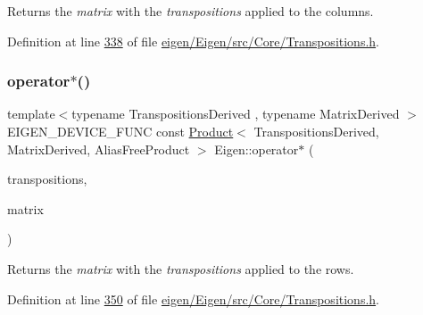 \begin{DoxyReturn}{Returns}
the {\itshape matrix} with the {\itshape transpositions} applied to the columns. 
\end{DoxyReturn}


Definition at line \hyperlink{eigen_2_eigen_2src_2_core_2_transpositions_8h_source_l00338}{338} of file \hyperlink{eigen_2_eigen_2src_2_core_2_transpositions_8h_source}{eigen/\+Eigen/src/\+Core/\+Transpositions.\+h}.

\mbox{\label{namespace_eigen_a4c63a9e3b8c513835a3b5551d98bd0c3}} 
\subsubsection{\texorpdfstring{operator$\ast$()}{operator*()}\hspace{0.1cm}{\footnotesize\ttfamily [6/9]}}
{\footnotesize\ttfamily template$<$typename Transpositions\+Derived , typename Matrix\+Derived $>$ \\
E\+I\+G\+E\+N\+\_\+\+D\+E\+V\+I\+C\+E\+\_\+\+F\+U\+NC const \hyperlink{group___core___module_class_eigen_1_1_product}{Product}$<$ Transpositions\+Derived, Matrix\+Derived, Alias\+Free\+Product $>$ Eigen\+::operator$\ast$ (\begin{DoxyParamCaption}\item[{const \hyperlink{class_eigen_1_1_transpositions_base}{Transpositions\+Base}$<$ Transpositions\+Derived $>$ \&}]{transpositions,  }\item[{const \hyperlink{group___core___module_class_eigen_1_1_matrix_base}{Matrix\+Base}$<$ Matrix\+Derived $>$ \&}]{matrix }\end{DoxyParamCaption})}

\begin{DoxyReturn}{Returns}
the {\itshape matrix} with the {\itshape transpositions} applied to the rows. 
\end{DoxyReturn}


Definition at line \hyperlink{eigen_2_eigen_2src_2_core_2_transpositions_8h_source_l00350}{350} of file \hyperlink{eigen_2_eigen_2src_2_core_2_transpositions_8h_source}{eigen/\+Eigen/src/\+Core/\+Transpositions.\+h}.

\mbox{\label{namespace_eigen_a6632b4f607fd51ab4560100fed76180f}} 
